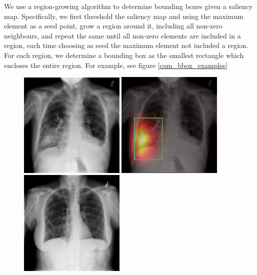 \documentclass[12pt,oneside,a4paper]{report}
\begin{document}
We use a region-growing algorithm to determine bounding boxes given a saliency
map. Specifically, we first threshold the saliency map and using the maximum
element as a seed point, grow a region around it, including all non-zero
neighbours, and repeat the same until all non-zero elements are included in a
region, each time choosing as seed the maximum element not included a region.
For each region, we determine a bounding box as the smallest rectangle which
encloses the entire region. For example, see figure \ref{cam_bbox_examples}

\begin{figure}
  \centering
  \includegraphics[width=0.45\textwidth]{images/pneumonia_orig}\hspace{0.01\textwidth}%
  \includegraphics[width=0.45\textwidth]{images/pneumonia_hm_bbox}\\[0.01\textwidth]
  \includegraphics[width=0.45\textwidth]{images/atelectasis_orig}\hspace{0.01\textwidth}%

\end{figure}
\end{document}
